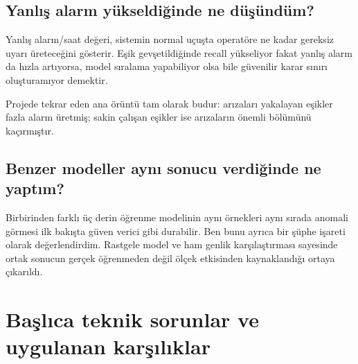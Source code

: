\documentclass[11pt,a4paper]{article}
\begin{document}
\subsection{Yanlış alarm yükseldiğinde ne düşündüm?}

Yanlış alarm/saat değeri, sistemin normal uçuşta operatöre ne kadar gereksiz
uyarı üreteceğini gösterir. Eşik gevşetildiğinde recall yükseliyor fakat yanlış
alarm da hızla artıyorsa, model sıralama yapabiliyor olsa bile güvenilir karar
sınırı oluşturamıyor demektir.

Projede tekrar eden ana örüntü tam olarak budur: arızaları yakalayan eşikler
fazla alarm üretmiş; sakin çalışan eşikler ise arızaların önemli bölümünü
kaçırmıştır.

\subsection{Benzer modeller aynı sonucu verdiğinde ne yaptım?}

Birbirinden farklı üç derin öğrenme modelinin aynı örnekleri aynı sırada
anomali görmesi ilk bakışta güven verici gibi durabilir. Ben bunu ayrıca bir
şüphe işareti olarak değerlendirdim. Rastgele model ve ham genlik karşılaştırması
sayesinde ortak sonucun gerçek öğrenmeden değil ölçek etkisinden kaynaklandığı
ortaya çıkarıldı.

\section{Başlıca teknik sorunlar ve uygulanan karşılıklar}
\end{document}
